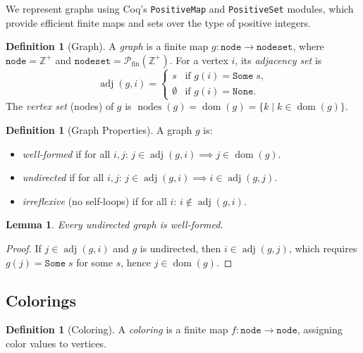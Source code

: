 \documentclass[11pt]{article}
\theoremstyle{plain}
\newtheorem{lemma}[theorem]{Lemma}
\theoremstyle{definition}
\newtheorem{definition}[theorem]{Definition}
\theoremstyle{remark}
\newcommand{\adj}{\operatorname{adj}}
\newcommand{\nodes}{\operatorname{nodes}}
\newcommand{\Mdomain}{\operatorname{dom}}
\newcommand{\Pos}{\mathbb{Z}^{+}}
\newcommand{\powerset}{\mathcal{P}}
\begin{document}
We represent graphs using Coq's \texttt{PositiveMap} and \texttt{PositiveSet} modules, which provide efficient finite maps and sets over the type of positive integers.

\begin{definition}[Graph]
A \emph{graph} is a finite map $g : \texttt{node} \to \texttt{nodeset}$, where $\texttt{node} = \Pos$ and $\texttt{nodeset} = \powerset_{\mathrm{fin}}(\Pos)$.
For a vertex $i$, its \emph{adjacency set} is
\[
  \adj(g, i) = \begin{cases} s & \text{if } g(i) = \texttt{Some}\; s, \\ \emptyset & \text{if } g(i) = \texttt{None}. \end{cases}
\]
The \emph{vertex set} (nodes) of $g$ is
$\nodes(g) = \Mdomain(g) = \{k \mid k \in \operatorname{dom}(g)\}$.
\end{definition}

\begin{definition}[Graph Properties]
A graph $g$ is:
\begin{itemize}[nosep]
  \item \emph{well-formed} if for all $i, j$: $j \in \adj(g, i) \implies j \in \operatorname{dom}(g)$.
  \item \emph{undirected} if for all $i, j$: $j \in \adj(g, i) \implies i \in \adj(g, j)$.
  \item \emph{irreflexive} (no self-loops) if for all $i$: $i \notin \adj(g, i)$.
\end{itemize}
\end{definition}

\begin{lemma}
\label{lem:undirected-wf}
Every undirected graph is well-formed.
\end{lemma}

\begin{proof}
If $j \in \adj(g, i)$ and $g$ is undirected, then $i \in \adj(g, j)$, which requires $g(j) = \texttt{Some}\; s$ for some $s$, hence $j \in \operatorname{dom}(g)$.
\end{proof}

\subsection{Colorings}

\begin{definition}[Coloring]
A \emph{coloring} is a finite map $f : \texttt{node} \to \texttt{node}$, assigning color values to vertices.
\end{definition}
\end{document}
